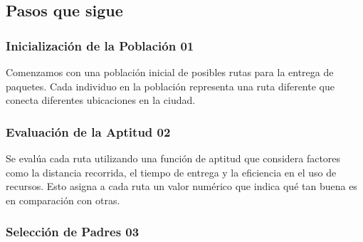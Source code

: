 \subsection{Pasos que sigue}


\subsubsection*{Inicialización de la Población 01}

Comenzamos con una población inicial de posibles rutas para la entrega de paquetes. 
Cada individuo en la población representa una ruta diferente que conecta diferentes 
ubicaciones en la ciudad.

\subsubsection*{Evaluación de la Aptitud 02}

Se evalúa cada ruta utilizando una función de aptitud que considera factores como la 
distancia recorrida, el tiempo de entrega y la eficiencia en el uso de recursos. 
Esto asigna a cada ruta un valor numérico que indica qué tan buena es en comparación 
con otras.


\subsubsection*{Selección de Padres 03}

